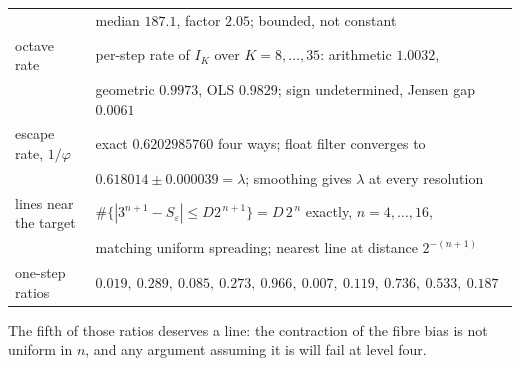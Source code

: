 \documentclass[11pt]{article}
\theoremstyle{remark}
\newcommand{\lam}{\lambda}
\newcommand{\eps}{\varepsilon}
\begin{document}
\begin{center}
\begin{tabular}{ll}
& median $187.1$, factor $2.05$; bounded, not constant\\
octave rate & per-step rate of $I_K$ over $K=8,\dots,35$: arithmetic $1.0032$,\\
& geometric $0.9973$, OLS $0.9829$; sign undetermined, Jensen gap $0.0061$\\
escape rate, $1/\varphi$ & exact $0.6202985760$ four ways; float filter converges to\\
& $0.618014\pm0.000039=\lam$; smoothing gives $\lam$ at every resolution\\
lines near the target & $\#\{|3^{n+1}-S_\eps|\le D2^{\,n+1}\}=D\,2^{\,n}$ exactly, $n=4,\dots,16$,\\
& matching uniform spreading; nearest line at distance $2^{-(n+1)}$\\
one-step ratios & $0.019,\ 0.289,\ 0.085,\ 0.273,\ 0.966,\ 0.007,\ 0.119,\ 0.736,\ 0.533,\ 0.187$\\
\bottomrule
\end{tabular}
\end{center}

The fifth of those ratios deserves a line: the contraction of the fibre bias is not uniform in $n$, and
any argument assuming it is will fail at level four.
\end{document}
